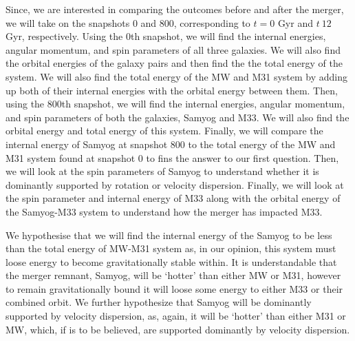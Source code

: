 \documentclass[twocolumn]{aastex631}
\begin{document}
Since, we are interested in comparing the outcomes before and after the merger, we will take on the snapshots 0 and 800, corresponding to $t=0$ Gyr and $t~12$ Gyr, respectively. Using the 0th snapshot, we will find the internal energies, angular momentum, and spin parameters of all three galaxies. We will also find the orbital energies of the galaxy pairs and then find the the total energy of the system. We will also find the total energy of the MW and M31 system by adding up both of their internal energies with the orbital energy between them. Then, using the 800th snapshot, we will find the internal energies, angular momentum, and spin parameters of both the galaxies, Samyog and M33. We will also find the orbital energy and total energy of this system. Finally, we will compare the internal energy of Samyog at snapshot 800 to the total energy of the MW and M31 system found at snapshot 0 to fins the answer to our first question. Then, we will look at the spin parameters of Samyog to understand whether it is dominantly supported by rotation or velocity dispersion. Finally, we will look at the spin parameter and internal energy of M33 along with the orbital energy of the Samyog-M33 system to understand how the merger has impacted M33.   

We hypothesise that we will find the internal energy of the Samyog to be less than the total energy of MW-M31 system as, in our opinion, this system must loose energy to become gravitationally stable within. It is understandable that the merger remnant, Samyog, will be `hotter' than either MW or M31, however to remain gravitationally bound it will loose some energy to either M33 or their combined orbit. We further hypothesize that Samyog will be dominantly supported by velocity dispersion, as, again, it will be `hotter' than either M31 or MW, which, if \cite{spin_param_explain} is to be believed, are supported dominantly by velocity dispersion. 


{}



\end{document}
